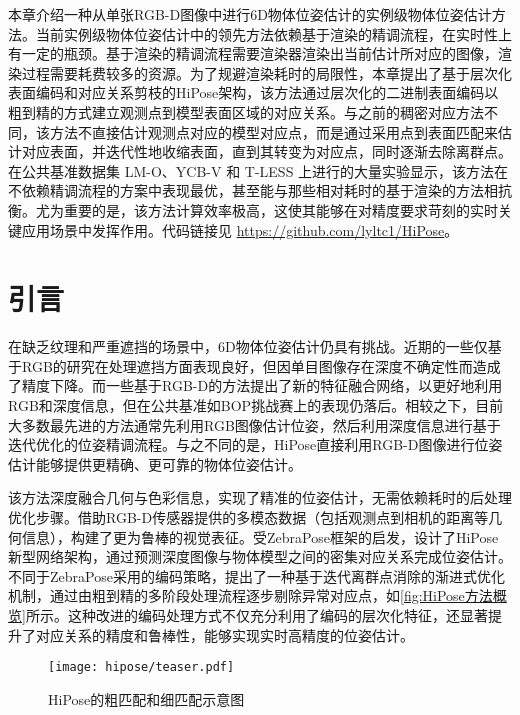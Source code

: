 本章介绍一种从单张RGB-D图像中进行6D物体位姿估计的实例级物体位姿估计方法。当前实例级物体位姿估计中的领先方法\cite{Sundermeyer2023BOPC2}依赖基于渲染的精调流程，在实时性上有一定的瓶颈。基于渲染的精调流程需要渲染器渲染出当前估计所对应的图像，渲染过程需要耗费较多的资源。为了规避渲染耗时的局限性，本章提出了基于层次化表面编码和对应关系剪枝的HiPose架构，该方法通过层次化的二进制表面编码以粗到精的方式建立观测点到模型表面区域的对应关系。与之前的稠密对应方法不同，该方法不直接估计观测点对应的模型对应点，而是通过采用点到表面匹配来估计对应表面，并迭代性地收缩表面，直到其转变为对应点，同时逐渐去除离群点。在公共基准数据集 LM-O、YCB-V 和 T-LESS 上进行的大量实验显示，该方法在不依赖精调流程的方案中表现最优，甚至能与那些相对耗时的基于渲染的方法相抗衡。尤为重要的是，该方法计算效率极高，这使其能够在对精度要求苛刻的实时关键应用场景中发挥作用。代码链接见 \url{https://github.com/lyltc1/HiPose}。

\section{引言}
在缺乏纹理和严重遮挡的场景中，6D物体位姿估计仍具有挑战。近期的一些仅基于RGB的研究\cite{su2022zebrapose}在处理遮挡方面表现良好，但因单目图像存在深度不确定性而造成了精度下降。而一些基于RGB-D的方法\cite{wang2019densefusion,he2020pvn3d,he2021ffb6d,zhou2023deep}提出了新的特征融合网络，以更好地利用RGB和深度信息，但在公共基准如BOP挑战赛\cite{Sundermeyer2023BOPC2}上的表现仍落后。相较之下，目前大多数最先进的方法通常先利用RGB图像估计位姿，然后利用深度信息进行基于迭代优化的位姿精调流程\cite{Rusinkiewicz2001EfficientVO,lipson2022coupled}。与之不同的是，HiPose直接利用RGB-D图像进行位姿估计能够提供更精确、更可靠的物体位姿估计。

该方法深度融合几何与色彩信息，实现了精准的位姿估计，无需依赖耗时的后处理优化步骤。借助RGB-D传感器提供的多模态数据（包括观测点到相机的距离等几何信息），构建了更为鲁棒的视觉表征。受ZebraPose\cite{su2022zebrapose}框架的启发，设计了HiPose新型网络架构，通过预测深度图像与物体模型之间的密集对应关系完成位姿估计。不同于ZebraPose采用的编码策略，提出了一种基于迭代离群点消除的渐进式优化机制，通过由粗到精的多阶段处理流程逐步剔除异常对应点，如\autoref{fig:HiPose方法概览}所示。这种改进的编码处理方式不仅充分利用了编码的层次化特征，还显著提升了对应关系的精度和鲁棒性，能够实现实时高精度的位姿估计。

\begin{figure}[ht]
    \centering
    \texttt{[image: hipose/teaser.pdf]}
    \caption{HiPose的粗匹配和细匹配示意图}
    \label{fig:HiPose方法概览}
\end{figure}


